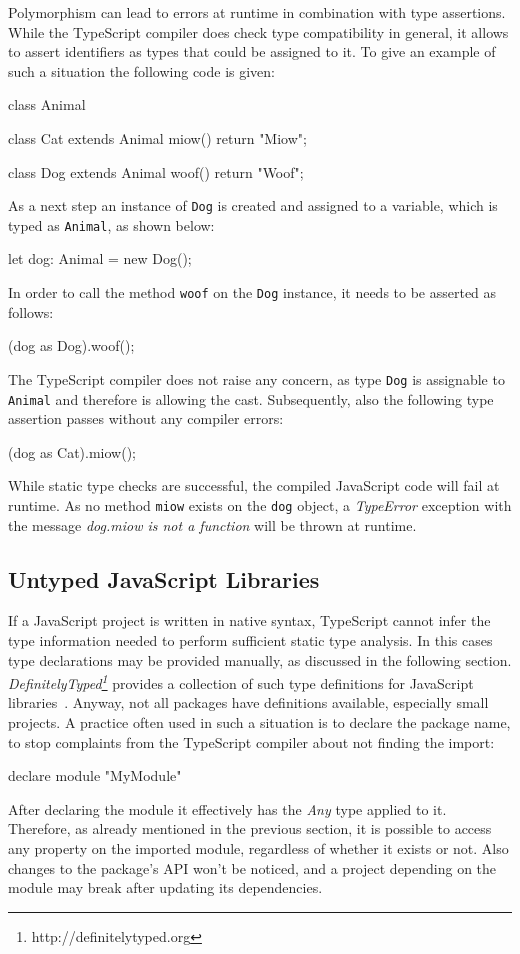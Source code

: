 Polymorphism can lead to errors at runtime in combination with type assertions. While the TypeScript compiler does check type compatibility in general, it allows to assert identifiers as types that could be assigned to it. To give an example of such a situation the following code is given:
\begin{JsCode}[numbers=none]
class Animal { }

class Cat extends Animal {
  miow() {
    return "Miow";
  }
}

class Dog extends Animal {
  woof() {
    return "Woof";
  }
}
\end{JsCode}
As a next step an instance of \texttt{Dog} is created and assigned to a variable, which is typed as \texttt{Animal}, as shown below:
\begin{JsCode}[numbers=none]
let dog: Animal = new Dog();
\end{JsCode}
In order to call the method \texttt{woof} on the \texttt{Dog} instance, it needs to be asserted as follows:
\begin{JsCode}[numbers=none]
(dog as Dog).woof();
\end{JsCode}
The TypeScript compiler does not raise any concern, as type \texttt{Dog} is assignable to \texttt{Animal} and therefore is allowing the cast. Subsequently, also the following type assertion passes without any compiler errors:
\begin{JsCode}[numbers=none]
(dog as Cat).miow();
\end{JsCode}
While static type checks are successful, the compiled JavaScript code will fail at runtime. As no method \texttt{miow} exists on the \texttt{dog} object, a \emph{TypeError} exception with the message \emph{dog.miow is not a function} will be thrown at runtime.

\subsection{Untyped JavaScript Libraries}

If a JavaScript project is written in native syntax, TypeScript cannot infer the type information needed to perform sufficient static type analysis. In this cases type declarations may be provided manually, as discussed in the following section. \emph{DefinitelyTyped\footnote{http://definitelytyped.org}} provides a collection of such type definitions for JavaScript libraries~\cite{DefinitelyTyped}. Anyway, not all packages have definitions available, especially small projects. A practice often used in such a situation is to declare the package name, to stop complaints from the TypeScript compiler about not finding the import:
\begin{JsCode}[numbers=none]
declare module "MyModule"
\end{JsCode}
After declaring the module it effectively has the \emph{Any} type applied to it. Therefore, as already mentioned in the previous section, it is possible to access any property on the imported module, regardless of whether it exists or not. Also changes to the package's API won't be noticed, and a project depending on the module may break after updating its dependencies.

